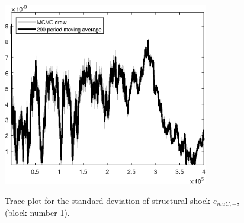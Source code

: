 \begin{figure}[H]
\centering
  \includegraphics[width=0.8\textwidth]{BRS_sectoral/graphs/TracePlot_SE_e_muC_news_8_blck_1}\\
    \caption{Trace plot for the standard deviation of structural shock ${e_{muC,-8}}$ (block number 1).}
\end{figure}
